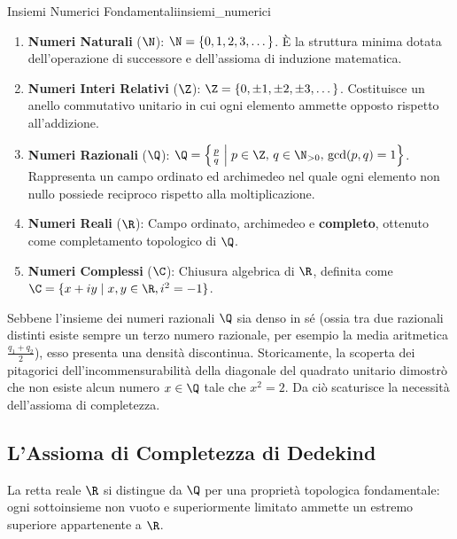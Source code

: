 \begin{definizione}{Insiemi Numerici Fondamentali}{insiemi_numerici}
\begin{enumerate}[label=\textbf{\arabic*.}]
    \item \textbf{Numeri Naturali} ($\N$): $\N = \{0, 1, 2, 3, \dots\}$. È la struttura minima dotata dell'operazione di successore e dell'assioma di induzione matematica.
    \item \textbf{Numeri Interi Relativi} ($\Z$): $\Z = \{0, \pm 1, \pm 2, \pm 3, \dots\}$. Costituisce un anello commutativo unitario in cui ogni elemento ammette opposto rispetto all'addizione.
    \item \textbf{Numeri Razionali} ($\Q$): $\Q = \left\{ \frac{p}{q} \;\middle|\; p \in \Z, \, q \in \N_{>0}, \, \gcd(p, q) = 1 \right\}$. Rappresenta un campo ordinato ed archimedeo nel quale ogni elemento non nullo possiede reciproco rispetto alla moltiplicazione.
    \item \textbf{Numeri Reali} ($\R$): Campo ordinato, archimedeo e \textbf{completo}, ottenuto come completamento topologico di $\Q$.
    \item \textbf{Numeri Complessi} ($\C$): Chiusura algebrica di $\R$, definita come $\C = \{x + iy \mid x, y \in \R, i^2 = -1\}$.
\end{enumerate}
\end{definizione}

Sebbene l'insieme dei numeri razionali $\Q$ sia denso in sé (ossia tra due razionali distinti esiste sempre un terzo numero razionale, per esempio la media aritmetica $\frac{q_1+q_2}{2}$), esso presenta una densità discontinua. Storicamente, la scoperta dei pitagorici dell'incommensurabilità della diagonale del quadrato unitario dimostrò che non esiste alcun numero $x \in \Q$ tale che $x^2 = 2$. Da ciò scaturisce la necessità dell'assioma di completezza.

\subsection{L'Assioma di Completezza di Dedekind}
La retta reale $\R$ si distingue da $\Q$ per una proprietà topologica fondamentale: ogni sottoinsieme non vuoto e superiormente limitato ammette un estremo superiore appartenente a $\R$.

